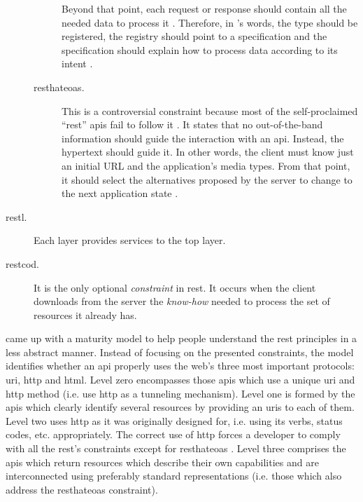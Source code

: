 \begin{description}
\begin{description}
	                        Beyond that point, each request or response should contain all the needed data to process it \citep{wahbe_self-descriptive_2010}.
	                        Therefore, in \citeauthor{fielding_seeking_2006}'s words,
	                        the type should be registered,
	                        the registry should point to a specification and 
	                        the specification should explain how to process data according to its intent \citep{fielding_seeking_2006}. %
	\item[\acf{resthateoas}.] This is a controversial constraint because most of the self-proclaimed ``\ac{rest}'' \acp{api} fail to follow it \citep{moore_hypermedia_2010,house_how_2012}.
	                           It states that no out-of-the-band information should guide the interaction with an \ac{api}.
	                           Instead, the hypertext should guide it.
	                           In other words, the client must know just an initial URL and the application's media types.
	                           From that point, it should select the alternatives proposed by the server to change to the next application state \citep{fielding_rest_2008}.
    \end{description}
 \item[\acf{restl}.] Each layer provides services to the top layer. %
 \item[\acf{restcod}.] It is the only optional \emph{constraint} in \ac{rest}.
		       It occurs when the client downloads from the server the \emph{know-how} needed to process the set of resources it already has.
\end{description}



\citet{richardson_introducing_2008} came up with a maturity model to help people understand the \ac{rest} principles in a less abstract manner.
Instead of focusing on the presented constraints, the model identifies whether an \ac{api} properly uses the web's three most important protocols: \ac{uri}, \ac{http} and \ac{html}.
Level zero encompasses those \acp{api} which use a unique \ac{uri} and \ac{http} method (i.e. use \ac{http} as a tunneling mechanism).
Level one is formed by the \acp{api} which clearly identify several resources by providing an \acp{uri} to each of them.
Level two uses \ac{http} as it was originally designed for, i.e. using its verbs, status codes, etc. appropriately. 
The correct use of \ac{http} forces a developer to comply with all the \ac{rest}'s constraints except for \ac{resthateoas} \citet{moore_hypermedia_2010}.
Level three comprises the \acp{api} which return resources which describe their own capabilities and are interconnected using preferably standard representations (i.e. those which also address the \acf{resthateoas} constraint).


